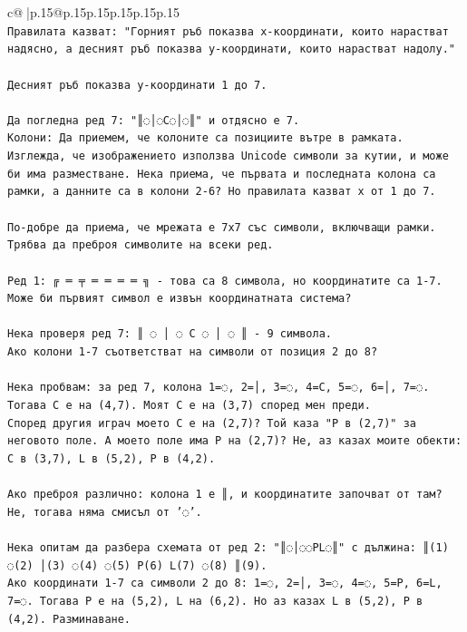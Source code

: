 \documentclass{article}
\begin{document}
{\begin{supertabular}{c@{$\;$}|p{.15\linewidth}@{}p{.15\linewidth}p{.15\linewidth}p{.15\linewidth}p{.15\linewidth}p{.15\linewidth}}
{{{\\ 
\texttt{Правилата казват: "Горният ръб показва x{-}координати, които нарастват надясно, а десният ръб показва y{-}координати, които нарастват надолу."} \\
\\ 
\texttt{Десният ръб показва y{-}координати 1 до 7.} \\
\\ 
\texttt{Да погледна ред 7: "║◌│◌C◌│◌║" и отдясно е 7.} \\
\texttt{Колони: Да приемем, че колоните са позициите вътре в рамката. Изглежда, че изображението използва Unicode символи за кутии, и може би има разместване. Нека приема, че първата и последната колона са рамки, а данните са в колони 2{-}6? Но правилата казват x от 1 до 7.} \\
\\ 
\texttt{По{-}добре да приема, че мрежата е 7x7 със символи, включващи рамки. Трябва да преброя символите на всеки ред.} \\
\\ 
\texttt{Ред 1: ╔ ═ ╤ ═ ═ ═ ═ ╗ {-} това са 8 символа, но координатите са 1{-}7. Може би първият символ е извън координатната система?} \\
\\ 
\texttt{Нека проверя ред 7: ║ ◌ │ ◌ C ◌ │ ◌ ║ {-} 9 символа.} \\
\texttt{Ако колони 1{-}7 съответстват на символи от позиция 2 до 8?} \\
\\ 
\texttt{Нека пробвам: за ред 7, колона 1=◌, 2=│, 3=◌, 4=C, 5=◌, 6=│, 7=◌. Тогава C е на (4,7). Моят C е на (3,7) според мен преди. } \\
\texttt{Според другия играч моето C е на (2,7)? Той каза "P в (2,7)" за неговото поле. А моето поле има P на (2,7)? Не, аз казах моите обекти: C в (3,7), L в (5,2), P в (4,2).} \\
\\ 
\texttt{Ако преброя различно: колона 1 е ║, и координатите започват от там? Не, тогава няма смисъл от '◌'.} \\
\\ 
\texttt{Нека опитам да разбера схемата от ред 2: "║◌│◌◌PL◌║" с дължина: ║(1) ◌(2) │(3) ◌(4) ◌(5) P(6) L(7) ◌(8) ║(9).} \\
\texttt{Ако координати 1{-}7 са символи 2 до 8: 1=◌, 2=│, 3=◌, 4=◌, 5=P, 6=L, 7=◌. Тогава P е на (5,2), L на (6,2). Но аз казах L в (5,2), P в (4,2). Разминаване.} \\
\\ 
}}}
\end{supertabular}}
\end{document}
